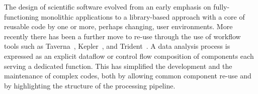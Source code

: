 The design of scientific software evolved from an early emphasis on fully-functioning 
  monolithic applications to a library-based
  approach with a core of reusable code by one or more,
  perhaps changing, user environments. More recently there has been a
  further move to re-use through the use of workflow tools such as
  Taverna~\cite{Taverna}, Kepler~\cite{Kepler}, and
  Trident~\cite{Trident}. A data analysis process is
  expressed as an explicit dataflow or control flow composition of components each serving a
  dedicated function. This has simplified the development and the maintenance of complex
  codes, both by allowing common component re-use and by highlighting
  the structure of the processing pipeline.



